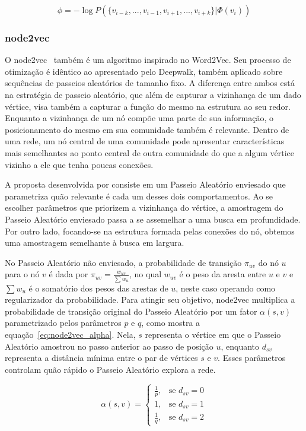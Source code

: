\begin{equation} \label{eq:deepwalk_cost}
    \phi = -\log P(\{v_{i-k},...,v_{i-1},v_{i+1},...,v_{i+k}\}|\Phi(v_i))
\end{equation}

\subsubsection{node2vec}

O node2vec~\cite{grover16} também é um algoritmo inspirado no Word2Vec.
Seu processo de otimização é idêntico ao apresentado pelo Deepwalk, também
aplicado sobre sequências de passeios aleatórios de tamanho fixo.
A diferença entre ambos está na estratégia de passeio aleatório, que além de
capturar a vizinhança de um dado vértice, visa também a capturar a função do
mesmo na estrutura ao seu redor.
Enquanto a vizinhança de um nó compõe uma parte de sua informação, o
posicionamento do mesmo em sua comunidade também é relevante.
Dentro de uma rede, um nó central de uma comunidade pode apresentar
características mais semelhantes ao ponto central de outra comunidade
do que a algum vértice vizinho a ele que tenha poucas conexões.

A proposta desenvolvida por \citet{grover16} consiste em um Passeio Aleatório
enviesado que parametriza quão relevante é cada um desses dois comportamentos.
Ao se escolher parâmetros que priorizem a vizinhança do vértice, a amostragem do
Passeio Aleatório enviesado passa a se assemelhar a uma busca em profundidade.
Por outro lado, focando-se na estrutura formada pelas conexões do nó, obtemos uma
amostragem semelhante à busca em largura.

No Passeio Aleatório não enviesado, a probabilidade de transição $\pi_{uv}$ do
nó $u$ para o nó $v$ é dada por $\pi_{uv} = \frac{w_{uv}}{\sum{w_u}}$, no qual
$w_{uv}$ é o peso da aresta entre $u$ e $v$ e $\sum{w_u}$ é o somatório dos
pesos das arestas de $u$, neste caso operando como regularizador da probabilidade.
Para atingir seu objetivo, node2vec multiplica a probabilidade de transição
original do Passeio Aleatório por um fator $\alpha(s, v)$ parametrizado pelos
parâmetros $p$ e $q$, como mostra a equação~\ref{eq:node2vec_alpha}.
Nela, $s$ representa o vértice em que o Passeio Aleatório amostrou no passo
anterior ao passo de posição $u$, enquanto $d_{sv}$ representa a distância
mínima entre o par de vértices $s$ e $v$.
Esses parâmetros controlam quão rápido o Passeio Aleatório explora a rede.

\begin{equation} \label{eq:node2vec_alpha}
    \alpha(s, v) =
    \begin{cases}
        \frac{1}{p} ,& \text{se } d_{sv} = 0\\
        1           ,& \text{se } d_{sv} = 1\\
        \frac{1}{q} ,& \text{se } d_{sv} = 2
    \end{cases}
\end{equation}

